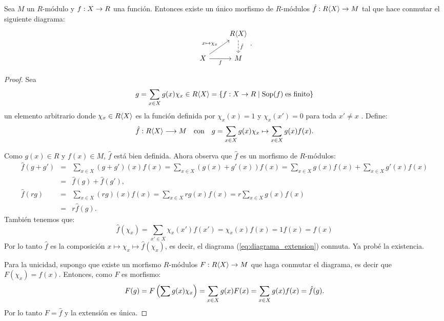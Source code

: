 \begin{ejercicio}\label{ej:52}
  Sea $M$ un $R$-m\'odulo y $f:X\rightarrow R$ una funci\'on. Entonces existe un \'unico morfismo de $R$-m\'odulos $\hat{f}:R\langle X \rangle\rightarrow M$
  tal que hace conmutar el siguiente diagrama:
  \begin{equation}\label{eq:diagrama_extension}
    \begin{tikzcd}
       & R\gen{X} \arrow[d,dashed,"\hat{f}"]\\
      X \arrow[ru,"x\mapsto\chi_x"] \arrow[r,"f"'] & M
    \end{tikzcd}.
  \end{equation}
\end{ejercicio}
\begin{proof}%
  Sea
    \[
      g=\sum_{x\in X} g(x)\chi_x \in R\langle X \rangle=\{f:X\rightarrow R\mid\text{Sop}(f)\;\text{es finito}\}
    \]
  un elemento arbitrario donde $\chi_x\in R\langle X \rangle$ es la funci\'on definida por $\chi_x(x)=1$ y $\chi_x(x')=0$ para toda
  $x'\neq x$ . Define:
    \[
      \hat{f}:R\langle X \rangle \longrightarrow M \quad\text{con}\quad  g=\sum_{x\in X}g(x)\chi_x \mapsto\sum_{x\in X} g(x) f(x).
    \]

  Como $g(x)\in R$ y $f(x)\in M$, $\hat{f}$ est\'a bien definida. Ahora observa que $\hat{f}$ es un morfismo de $R$-m\'odulos:
  \begin{eqnarray*}
    \hat{f}(g+g')&=&\sum_{x\in X} (g+g')(x)f(x) = \sum_{x\in X}(g(x)+g'(x))f(x)= \sum_{x\in X}g(x)f(x)+\sum_{x\in X}g'(x)f(x)\\
                 &=&\hat{f}(g)+\hat{f}(g'), \\
    \hat{f}(rg)&=&\sum_{x\in X}(rg)(x)f(x)=\sum_{x\in X}rg(x)f(x)=r\sum_{x\in X} g(x)f(x)\\
               &=&r \hat{f}(g).
  \end{eqnarray*}
  Tambi\'en tenemos que:
  \[
    \hat{f}(\chi_x)=\sum_{x'\in X}\chi_x(x') f(x')=\chi_x(x)f(x)=1f(x)=f(x)
  \]
  Por lo tanto $\hat{f}$ es la composici\'on $x\mapsto\chi_x\mapsto \hat{f}(\chi_x)$, es decir, el diagrama (\ref{eq:diagrama_extension})
  conmuta. Ya prob\'e la existencia.

  Para la unicidad, supongo que existe un morfismo $R$-m\'odulos $F:R\langle X \rangle\rightarrow M$ que haga conmutar el diagrama, es
  decir que $F(\chi_x)=f(x)$. Entonces, como $F$ es morfismo:
  \[
    F(g)=F\left( \sum g(x)\chi_x \right)=\sum_{x\in X} g(x) F(x)=\sum_{x\in X}g(x)f(x)=\hat{f}(g).
  \]
  Por lo tanto $F=\hat{f}$ y la extensi\'on es \'unica.
\end{proof}%

